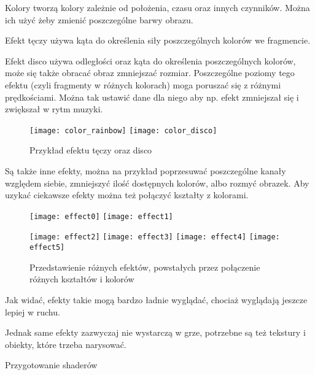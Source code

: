 
Kolory tworzą kolory zależnie od położenia, czasu oraz innych czynników. Można ich użyć żeby zmienić poszczególne barwy obrazu.


Efekt tęczy używa kąta do okre\'slenia siły poszczególnych kolorów we fragmencie.



Efekt disco używa odległo\'sci oraz kąta do okre\'slenia poszczególnych kolorów, może się także obracać obraz zmniejszać rozmiar. Poszczególne poziomy tego efektu (czyli fragmenty w różnych kolorach) moga poruszać się z różnymi prędko\'sciami. Można tak ustawić dane dla niego aby np. efekt zmniejszał się i zwiększał w rytm muzyki.

\begin{figure}[h]
	\centering
	\noindent\texttt{[image: color\_rainbow]}
	\noindent\texttt{[image: color\_disco]}
	\caption{Przykład efektu tęczy oraz disco}
\end{figure}

Są także inne efekty, można na przykład poprzesuwać poszczególne kanały względem siebie, zmniejszyć ilo\'sć dostępnych kolorów, albo rozmyć obrazek. Aby uzykać ciekawsze efekty można też połączyć kształty z kolorami.
\begin{figure}[h]
	\centering
	\noindent\texttt{[image: effect0]}
	\noindent\texttt{[image: effect1]}
\end{figure}\newpage

\begin{figure}[h]
	\centering
	\noindent\texttt{[image: effect2]}
	\noindent\texttt{[image: effect3]}
	\noindent\texttt{[image: effect4]}
	\noindent\texttt{[image: effect5]}
	\caption{Przedstawienie różnych efektów, powstałych przez połączenie różnych kształtów i kolorów}
\end{figure}\smallskip

\noindent Jak widać, efekty takie mogą bardzo ładnie wyglądać, chociaż wyglądają jeszcze lepiej w ruchu. 

Jednak same efekty zazwyczaj nie wystarczą w grze, potrzebne są też tekstury i obiekty, które trzeba narysować.\bigskip

{\LARGE Przygotowanie shaderów}\smallskip

